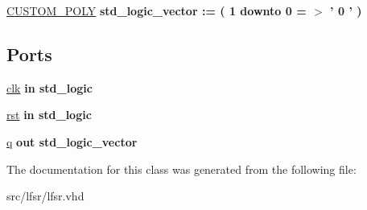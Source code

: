 \begin{DoxyCompactItemize}
\item 
\hypertarget{classlfsr_a7d64141a514f3177a611abb7f25e6f6f}{\hyperlink{classlfsr_a7d64141a514f3177a611abb7f25e6f6f}{C\-U\-S\-T\-O\-M\-\_\-\-P\-O\-L\-Y} {\bfseries {\bfseries \textcolor{comment}{std\-\_\-logic\-\_\-vector}\textcolor{vhdlchar}{ }\textcolor{vhdlchar}{\-:}\textcolor{vhdlchar}{=}\textcolor{vhdlchar}{ }\textcolor{vhdlchar}{(}\textcolor{vhdlchar}{ }\textcolor{vhdlchar}{ } \textcolor{vhdldigit}{1} \textcolor{vhdlchar}{ }\textcolor{vhdlchar}{ }\textcolor{vhdlchar}{ }\textcolor{vhdlkeyword}{downto}\textcolor{vhdlchar}{ }\textcolor{vhdlchar}{ }\textcolor{vhdlchar}{ } \textcolor{vhdldigit}{0} \textcolor{vhdlchar}{ }\textcolor{vhdlchar}{ }\textcolor{vhdlchar}{=}\textcolor{vhdlchar}{ }\textcolor{vhdlchar}{$>$}\textcolor{vhdlchar}{ }\textcolor{vhdlchar}{'}\textcolor{vhdlchar}{ } \textcolor{vhdldigit}{0} \textcolor{vhdlchar}{ }\textcolor{vhdlchar}{'}\textcolor{vhdlchar}{ }\textcolor{vhdlchar}{ }\textcolor{vhdlchar}{)}\textcolor{vhdlchar}{ }}}}\label{classlfsr_a7d64141a514f3177a611abb7f25e6f6f}

\end{DoxyCompactItemize}
\subsection*{Ports}
 \begin{DoxyCompactItemize}
\item 
\hypertarget{classlfsr_aec59ad7fb872308b3e1a455c5328cdff}{\hyperlink{classlfsr_aec59ad7fb872308b3e1a455c5328cdff}{clk}  {\bfseries {\bfseries \textcolor{vhdlkeyword}{in}\textcolor{vhdlchar}{ }}} {\bfseries \textcolor{comment}{std\-\_\-logic}\textcolor{vhdlchar}{ }} }\label{classlfsr_aec59ad7fb872308b3e1a455c5328cdff}

\item 
\hypertarget{classlfsr_a5cf3e8e1cb15fcfc3619d8dc23942d9c}{\hyperlink{classlfsr_a5cf3e8e1cb15fcfc3619d8dc23942d9c}{rst}  {\bfseries {\bfseries \textcolor{vhdlkeyword}{in}\textcolor{vhdlchar}{ }}} {\bfseries \textcolor{comment}{std\-\_\-logic}\textcolor{vhdlchar}{ }} }\label{classlfsr_a5cf3e8e1cb15fcfc3619d8dc23942d9c}

\item 
\hypertarget{classlfsr_a4b652fca0dff23dedf468470a5d9142c}{\hyperlink{classlfsr_a4b652fca0dff23dedf468470a5d9142c}{q}  {\bfseries {\bfseries \textcolor{vhdlkeyword}{out}\textcolor{vhdlchar}{ }}} {\bfseries \textcolor{comment}{std\-\_\-logic\-\_\-vector}\textcolor{vhdlchar}{ }} }\label{classlfsr_a4b652fca0dff23dedf468470a5d9142c}

\end{DoxyCompactItemize}


The documentation for this class was generated from the following file\-:\begin{DoxyCompactItemize}
\item 
src/lfsr/lfsr.\-vhd\end{DoxyCompactItemize}
